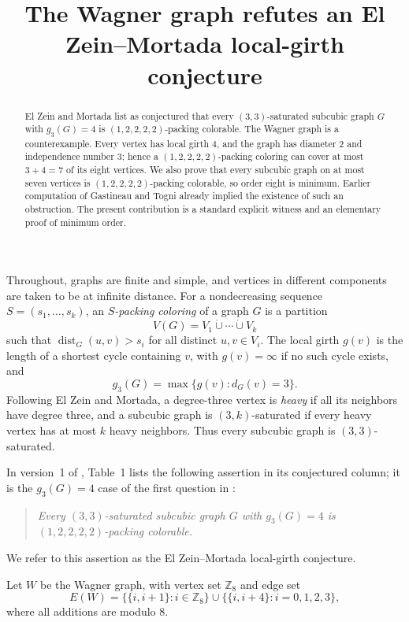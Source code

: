 \documentclass[11pt]{amsart}
\title[A Wagner-graph counterexample]
      {The Wagner graph refutes an El Zein--Mortada local-girth conjecture}
\date{}
\newcommand{\Z}{\mathbb Z}
\newcommand{\dist}{\operatorname{dist}}
\begin{document}
\begin{abstract}
El Zein and Mortada list as conjectured that every $(3,3)$-saturated
subcubic graph $G$ with $g_3(G)=4$ is $(1,2,2,2,2)$-packing colorable.
The Wagner graph is a counterexample. Every vertex has local girth $4$,
and the graph has diameter $2$ and independence number $3$; hence a
$(1,2,2,2,2)$-packing coloring can cover at most $3+4=7$ of its eight
vertices. We also prove that every subcubic graph on at most seven
vertices is $(1,2,2,2,2)$-packing colorable, so order eight is minimum.
Earlier computation of Gastineau and Togni already implied the existence
of such an obstruction. The present contribution is a standard explicit
witness and an elementary proof of minimum order.
\end{abstract}

\maketitle

Throughout, graphs are finite and simple, and vertices in different
components are taken to be at infinite distance. For a nondecreasing
sequence $S=(s_1,\ldots,s_k)$, an \emph{$S$-packing coloring} of a graph
$G$ is a partition
\[
  V(G)=V_1\mathbin{\dot\cup}\cdots\mathbin{\dot\cup}V_k
\]
such that $\dist_G(u,v)>s_i$ for all distinct $u,v\in V_i$.
The local girth $g(v)$ is the length of a shortest cycle containing $v$,
with $g(v)=\infty$ if no such cycle exists, and
\[
  g_3(G)=\max\{g(v):d_G(v)=3\}.
\]
Following El Zein and Mortada, a degree-three vertex is \emph{heavy} if
all its neighbors have degree three, and a subcubic graph is
$(3,k)$-saturated if every heavy vertex has at most $k$ heavy neighbors.
Thus every subcubic graph is $(3,3)$-saturated.

In version~1 of \cite{ElZeinMortadaImpact}, Table~1 lists the following
assertion in its conjectured column; it is the $g_3(G)=4$ case of the
first question in \cite[Problem~1]{ElZeinMortadaStep}:
\begin{quote}
\emph{Every $(3,3)$-saturated subcubic graph $G$ with $g_3(G)=4$ is
$(1,2,2,2,2)$-packing colorable.}
\end{quote}
We refer to this assertion as the El Zein--Mortada local-girth conjecture.

Let $W$ be the Wagner graph, with vertex set $\Z_8$ and edge set
\[
 E(W)=\bigl\{\{i,i+1\}:i\in\Z_8\bigr\}
      \cup
      \bigl\{\{i,i+4\}:i=0,1,2,3\bigr\},
\]
where all additions are modulo $8$.
\end{document}
